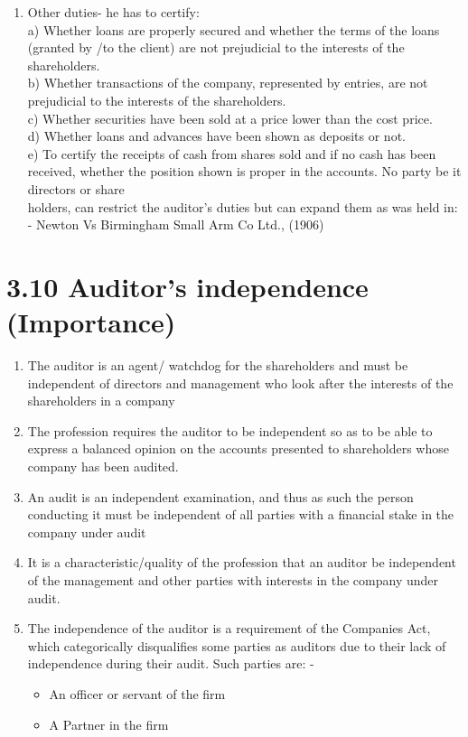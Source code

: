 \documentclass[10pt]{article}
\begin{document}
\begin{enumerate}
  The profit and loss account\\
  The balance sheet\\
  Fund flow statements.\\
  \item Other duties- he has to certify:\\
  a) Whether loans are properly secured and whether the terms of the loans (granted by /to the client) are not prejudicial to the interests of the shareholders.\\
  b) Whether transactions of the company, represented by entries, are not prejudicial to the interests of the shareholders.\\
  c) Whether securities have been sold at a price lower than the cost price.\\
  d) Whether loans and advances have been shown as deposits or not.\\
  e) To certify the receipts of cash from shares sold and if no cash has been received, whether the position shown is proper in the accounts. No party be it directors or share\\
  holders, can restrict the auditor's duties but can expand them as was held in: - Newton Vs Birmingham Small Arm Co Ltd., (1906)
  
\end{enumerate} 
\section*{3.10 Auditor's independence (Importance)}
\begin{enumerate}
  \item The auditor is an agent/ watchdog for the shareholders and must be independent of directors and management who look after the interests of the shareholders in a company
  \item The profession requires the auditor to be independent so as to be able to express a balanced opinion on the accounts presented to shareholders whose company has been audited.
  \item An audit is an independent examination, and thus as such the person conducting it must be independent of all parties with a financial stake in the company under audit
  \item It is a characteristic/quality of the profession that an auditor be independent of the management and other parties with interests in the company under audit.
  \item The independence of the auditor is a requirement of the Companies Act, which categorically disqualifies some parties as auditors due to their lack of independence during their audit. Such parties are: -
  \begin{itemize}
  	\item An officer or servant of the firm
  	\item A Partner in the firm
  \end{itemize}
\end{enumerate}
\end{document}
